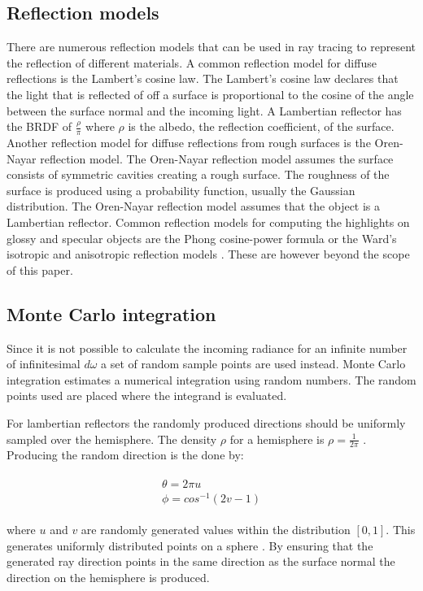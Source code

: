 \documentclass[twocolumn]{article}
\begin{document}
\subsection{Reflection models}
There are numerous reflection models that can be used in ray tracing to represent the reflection of different materials. A common reflection model for diffuse reflections is the Lambert's cosine law. The Lambert's cosine law declares that the light that is reflected of off a surface is proportional to the cosine of the angle between the surface normal and the incoming light. A Lambertian reflector has the BRDF of $\frac{\rho}{\pi}$ where $\rho$ is the albedo, the reflection coefficient, of the surface.
Another reflection model for diffuse reflections from rough surfaces is the Oren-Nayar reflection model. The Oren-Nayar reflection model assumes the surface consists of symmetric cavities creating a rough surface. The roughness of the surface is produced using a probability function, usually the Gaussian distribution. The Oren-Nayar reflection model assumes that the object is a Lambertian reflector.
Common reflection models for computing the highlights on glossy and specular objects are the Phong cosine-power formula or the Ward's isotropic and anisotropic reflection models \cite{hq}. These are however beyond the scope of this paper.

\subsection{Monte Carlo integration}
	Since it is not possible to calculate the incoming radiance for an infinite number of infinitesimal $d\omega$ a set of random sample points are used instead. Monte Carlo integration estimates a numerical integration using random numbers. The random points used are placed where the integrand is evaluated. 

For lambertian reflectors the randomly produced directions should be uniformly sampled over the hemisphere. The density $\rho$ for a hemisphere is $\rho = \frac{1}{2\pi}$ \cite{CG:PP}. Producing the random direction is the done by:


\begin{align*}
	\begin{split}
		\theta = 2\pi u \\
		\phi = cos^{-1}(2v - 1)
	\end{split}
\end{align*}

where $u$ and $v$ are randomly generated values within the distribution $[0, 1]$. This generates uniformly distributed points on a sphere \cite{wolfram}. By ensuring that the generated ray direction points in the same direction as the surface normal the direction on the hemisphere is produced.
\end{document}
